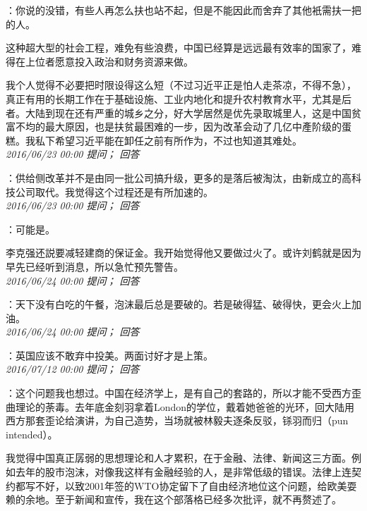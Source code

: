 \documentclass[twocolumn]{ctexart}
\begin{document}
：你说的没错，有些人再怎么扶也站不起，但是不能因此而舍弃了其他衹需扶一把的人。

这种超大型的社会工程，难免有些浪费，中国已经算是远远最有效率的国家了，难得在上位者愿意投入政治和财务资源来做。

我个人觉得不必要把时限设得这么短（不过习近平正是怕人走茶凉，不得不急），真正有用的长期工作在于基础设施、工业内地化和提升农村教育水平，尤其是后者。大陆到现在还有严重的城乡之分，好大学居然是优先录取城里人，这是中国贫富不均的最大原因，也是扶贫最困难的一步，因为改革会动了几亿中產阶级的蛋糕。我私下希望习近平能在卸任之前有所作为，不过也知道其难处。\\

\textit{\hfill\noindent\small 2016/06/23 00:00 提问； 回答}

：供给侧改革并不是由同一批公司搞升级，更多的是落后被淘汰，由新成立的高科技公司取代。我觉得这个过程还是有所加速的。\\

\textit{\hfill\noindent\small 2016/06/23 00:00 提问； 回答}

：可能是。

李克强还説要减轻建商的保证金。我开始觉得他又要做过火了。或许刘鹤就是因为早先已经听到消息，所以急忙预先警告。\\

\textit{\hfill\noindent\small 2016/06/24 00:00 提问； 回答}

：天下没有白吃的午餐，泡沫最后总是要破的。若是破得猛、破得快，更会火上加油。\\

\textit{\hfill\noindent\small 2016/06/24 00:00 提问； 回答}

：英国应该不敢弃中投美。两面讨好才是上策。\\

\textit{\hfill\noindent\small 2016/07/12 00:00 提问； 回答}

：这个问题我也想过。中国在经济学上，是有自己的套路的，所以才能不受西方歪曲理论的荼毒。去年底金刻羽拿着London的学位，戴着她爸爸的光环，回大陆用西方那套歪论给演讲，为自己造势，当场就被林毅夫逐条反驳，铩羽而归（pun intended）。

我觉得中国真正孱弱的思想理论和人才累积，在于金融、法律、新闻这三方面。例如去年的股市泡沫，对像我这样有金融经验的人，是非常低级的错误。法律上连契约都写不好，以致2001年签的WTO协定留下了自由经济地位这个问题，给欧美耍赖的余地。至于新闻和宣传，我在这个部落格已经多次批评，就不再赘述了。\\
\end{document}
